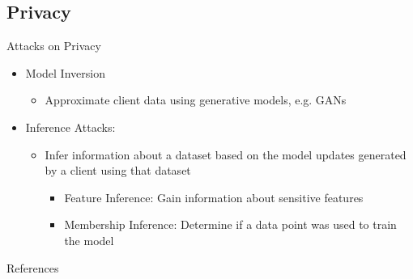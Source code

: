 \documentclass[t,aspectratio=169]{beamer}
\begin{document}
\subsection{Privacy}
\begin{frame}{Attacks on Privacy}
    \vspace*{\fill}
    \begin{itemize}
        \item Model Inversion
        \begin{itemize}
            \item[] Approximate client data using generative models, e.g. GANs
        \end{itemize}
        \item Inference Attacks: 
        \begin{itemize}
        \item[] Infer information about a dataset based on the model updates generated by a client using that dataset
        \begin{itemize}
            \item Feature Inference: Gain information about sensitive features
            \item Membership Inference: Determine if a data point was used to train the model
            \end{itemize}
        \end{itemize}
    \end{itemize}
    \vspace*{\fill}
\end{frame}

\begin{frame}{References}
\printbibliography
    
\end{frame}
\end{document}
